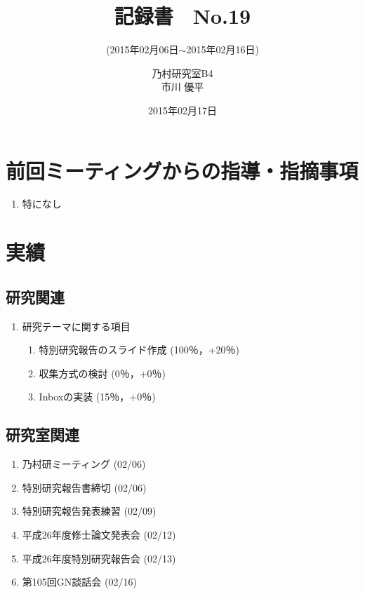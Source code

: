 \documentclass[fleqn, 14pt]{extarticle}
\subtitle{(2015年02月06日$\sim$2015年02月16日)}
\author{乃村研究室B4\\市川 優平}
\date{2015年02月17日}
\title{記録書　No.19}
\begin{document}
\maketitle
\section{前回ミーティングからの指導・指摘事項}
\label{sec1}
\begin{enumerate}
  \item 特になし
\end{enumerate}

\section{実績}
\label{sec2}
\subsection{研究関連}
\label{sec2-1}
\begin{enumerate}
\item 研究テーマに関する項目
  \hfill
  \label{sec2-1-1}
  \begin{enumerate}
  \item 特別研究報告のスライド作成
    \hfill
    \label{sec2-1-1-enum1}
    (100％，+20％)
\item 収集方式の検討
  \hfill
  \label{sec2-1-1-enum2}
    (0％，+0％)
  \item Inboxの実装
    \hfill
    \label{sec2-1-1-enum3}
    (15％，+0％)
  \end{enumerate}
\end{enumerate}

\subsection{研究室関連}
\label{sec2-2}
\begin{enumerate}
\item 乃村研ミーティング
  \hfill
  \label{sec2-2-enum1}
  (02/06)
\item 特別研究報告書締切
  \hfill
  \label{sec2-2-enum2}
  (02/06)
\item 特別研究報告発表練習
  \hfill
  \label{sec2-2-enum3}
  (02/09)
\item 平成26年度修士論文発表会
  \hfill
  \label{sec2-2-enum4}
  (02/12)
\item 平成26年度特別研究報告会
  \hfill
  \label{sec2-2-enum5}
  (02/13)
\item 第105回GN談話会
  \hfill
  \label{sec2-2-enum6}
  (02/16)
\end{enumerate}
\end{document}
